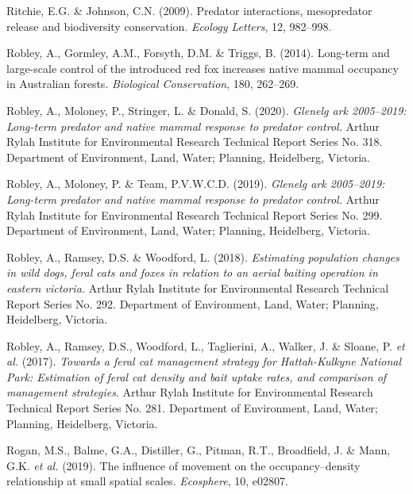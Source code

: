 \documentclass[11pt,a4paper,titlepage,twoside,openright]{style/unimelbthesis}
\begin{document}
\begin{mainmatter}
\leavevmode\hypertarget{ref-ritchie2009predator}{}%
Ritchie, E.G. \& Johnson, C.N. (2009). Predator interactions, mesopredator release and biodiversity conservation. \emph{Ecology Letters}, 12, 982--998.

\leavevmode\hypertarget{ref-robley2014long}{}%
Robley, A., Gormley, A.M., Forsyth, D.M. \& Triggs, B. (2014). Long-term and large-scale control of the introduced red fox increases native mammal occupancy in Australian forests. \emph{Biological Conservation}, 180, 262--269.

\leavevmode\hypertarget{ref-robley2020glenelg}{}%
Robley, A., Moloney, P., Stringer, L. \& Donald, S. (2020). \emph{Glenelg ark 2005--2019: Long-term predator and native mammal response to predator control.} Arthur Rylah Institute for Environmental Research Technical Report Series No. 318. Department of Environment, Land, Water; Planning, Heidelberg, Victoria.

\leavevmode\hypertarget{ref-robley2019otway}{}%
Robley, A., Moloney, P. \& Team, P.V.W.C.D. (2019). \emph{Glenelg ark 2005--2019: Long-term predator and native mammal response to predator control.} Arthur Rylah Institute for Environmental Research Technical Report Series No. 299. Department of Environment, Land, Water; Planning, Heidelberg, Victoria.

\leavevmode\hypertarget{ref-robley2018estimating}{}%
Robley, A., Ramsey, D.S. \& Woodford, L. (2018). \emph{Estimating population changes in wild dogs, feral cats and foxes in relation to an aerial baiting operation in eastern victoria.} Arthur Rylah Institute for Environmental Research Technical Report Series No. 292. Department of Environment, Land, Water; Planning, Heidelberg, Victoria.

\leavevmode\hypertarget{ref-robley2017towards}{}%
Robley, A., Ramsey, D.S., Woodford, L., Taglierini, A., Walker, J. \& Sloane, P. \emph{et al.} (2017). \emph{Towards a feral cat management strategy for Hattah-Kulkyne National Park: Estimation of feral cat density and bait uptake rates, and comparison of management strategies}. Arthur Rylah Institute for Environmental Research Technical Report Series No. 281. Department of Environment, Land, Water; Planning, Heidelberg, Victoria.

\leavevmode\hypertarget{ref-rogan2019influence}{}%
Rogan, M.S., Balme, G.A., Distiller, G., Pitman, R.T., Broadfield, J. \& Mann, G.K. \emph{et al.} (2019). The influence of movement on the occupancy--density relationship at small spatial scales. \emph{Ecosphere}, 10, e02807.


\end{mainmatter}
\end{document}
